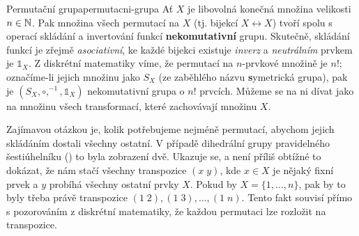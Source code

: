 \begin{example}{Permutační grupa}{permutacni-grupa}
 Ať $X$ je libovolná konečná množina velikosti $n \in \mathbb{N}$. Pak množina všech
 permutací na $X$ (tj. bijekcí $X \leftrightarrow X$) tvoří spolu s operací
 skládání a invertování funkcí \textbf{nekomutativní} grupu. Skutečně, skládání
 funkcí je zřejmě \emph{asociativní}, ke každé bijekci existuje \emph{inverz} a
 \emph{neutrálním} prvkem je $\mathds{1}_{X}$. Z diskrétní matematiky víme, že
 permutací na $n$-prvkové množině je $n!$; označíme-li jejich množinu jako $S_X$
 (ze zaběhlého názvu \textbf{s}ymetrická grupa), pak je $(S_X,
 \circ,^{-1},\mathds{1}_{X})$ nekomutativní grupa o $n!$ prvcích. Můžeme se na
 ni dívat jako na množinu všech transformací, které zachovávají množinu $X$.

 Zajímavou otázkou je, kolik potřebujeme nejméně permutací, abychom jejich
 skládáním dostali všechny ostatní. V případě dihedrální grupy pravidelného
 šestiúhelníku () to byla zobrazení dvě.
 Ukazuje se, a není příliš obtížné to dokázat, že nám stačí všechny transpozice
 $(x \; y)$, kde $x \in X$ je nějaký fixní prvek a $y$ probíhá všechny ostatní
 prvky $X$. Pokud by $X = \{1,\ldots,n\}$, pak by to byly třeba právě
 transpozice $(1 \; 2), (1 \; 3),\ldots,(1 \; n)$. Tento fakt souvisí přímo s
 pozorováním z diskrétní matematiky, že každou permutaci lze rozložit na
 transpozice. 
\end{example}

